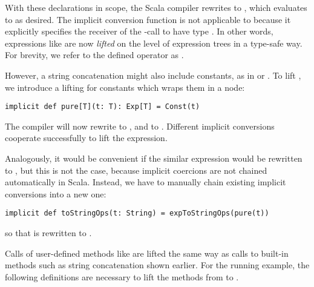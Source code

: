 With these declarations in scope, the Scala compiler rewrites  to
\linebreak{}, which evaluates to  as desired.
The implicit conversion function  is not applicable to  because it explicitly specifies the receiver of the \code{+}-call to have type .
In other words, expressions like  are now \emph{lifted} on the level of expression trees in a type-safe way. For brevity, we refer to the defined operator as .

However, a string concatenation might also include constants, as in  or .
To lift , we introduce a lifting for constants which wraps them in a  node:

\begin{lstlisting}
implicit def pure[T](t: T): Exp[T] = Const(t)
\end{lstlisting}

The compiler will now rewrite  to , and
\linebreak{} to .
Different implicit conversions cooperate successfully to lift the expression.

Analogously, it would be convenient if the similar expression  would be rewritten to , but this is not the case, because implicit coercions are not chained automatically in Scala.
Instead, we have to manually chain existing implicit conversions into a new one:
\begin{lstlisting}
implicit def toStringOps(t: String) = expToStringOps(pure(t))
\end{lstlisting}
so that  is rewritten to .

Calls of user-defined methods like  are lifted the same way as calls to built-in methods such as string concatenation shown earlier. For the running example, the following definitions are necessary to lift the methods from  to .

